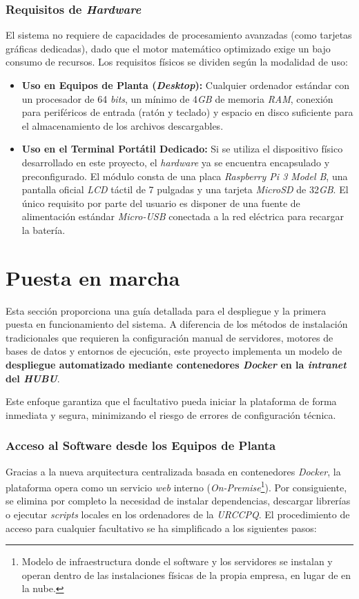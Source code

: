 \subsubsection{Requisitos de \textit{Hardware}}
El sistema no requiere de capacidades de procesamiento avanzadas (como tarjetas gráficas dedicadas), dado que el motor matemático optimizado exige un bajo consumo de recursos. Los requisitos físicos se dividen según la modalidad de uso:

\begin{itemize}
    \item \textbf{Uso en Equipos de Planta (\textit{Desktop}):} Cualquier ordenador estándar con un procesador de 64 \textit{bits}, un mínimo de 4\textit{GB} de memoria \textit{RAM}, conexión para periféricos de entrada (ratón y teclado) y espacio en disco suficiente para el almacenamiento de los archivos descargables.
    \item \textbf{Uso en el Terminal Portátil Dedicado:} Si se utiliza el dispositivo físico desarrollado en este proyecto, el \textit{hardware} ya se encuentra encapsulado y preconfigurado. El módulo consta de una placa \textit{Raspberry Pi 3 Model B}, una pantalla oficial \textit{LCD} táctil de 7 pulgadas y una tarjeta \textit{MicroSD} de 32\textit{GB}. El único requisito por parte del usuario es disponer de una fuente de alimentación estándar \textit{Micro-USB} conectada a la red eléctrica para recargar la batería.
\end{itemize}

\section{Puesta en marcha}
Esta sección proporciona una guía detallada para el despliegue y la primera puesta en funcionamiento del sistema. A diferencia de los métodos de instalación tradicionales que requieren la configuración manual de servidores, motores de bases de datos y entornos de ejecución, este proyecto implementa un modelo de \textbf{despliegue automatizado mediante contenedores \textit{Docker} en la \textit{intranet} del \textit{HUBU}}. 

Este enfoque garantiza que el facultativo pueda iniciar la plataforma de forma inmediata y segura, minimizando el riesgo de errores de configuración técnica.

\subsubsection{Acceso al Software desde los Equipos de Planta}
Gracias a la nueva arquitectura centralizada basada en contenedores \textit{Docker}, la plataforma opera como un servicio \textit{web} interno (\textit{On-Premise}\footnote{ Modelo de infraestructura donde el software y los servidores se instalan y operan dentro de las instalaciones físicas de la propia empresa, en lugar de en la nube.}). Por consiguiente, se elimina por completo la necesidad de instalar dependencias, descargar librerías o ejecutar \textit{scripts} locales en los ordenadores de la \textit{URCCPQ}. El procedimiento de acceso para cualquier facultativo se ha simplificado a los siguientes pasos:

